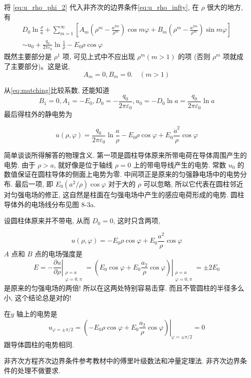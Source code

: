 将 \eqref{eq:u_rho_phi_2} 代入非齐次的边界条件\eqref{eq:u_rho_infty}, 在 $\rho$ 很大的地方, 有
\begin{equation}
    \begin{gathered}
        D_{0} \ln \frac{\rho}{a}+\sum_{m=1}^{\infty}\left[A_{m}\left(\rho^{m}-\frac{a^{2 m}}{\rho^{m}}\right) \cos m \varphi+B_{m}\left(\rho^{m}-\frac{a^{2 m}}{\rho^{m}}\right) \sin m \varphi\right] \\
        \sim u_{0}+\frac{q_{0}}{2 \pi \varepsilon_{0}} \ln \frac{1}{\rho}-E_{0} \rho \cos \varphi
    \end{gathered}
    \label{eq:matching}
\end{equation}
既然主要部分是 $\rho^{1}$ 项, 可见上式中不应出现 $\rho^{m}(m>1)$ 的项 (否则 $\rho^{m}$ 项就成了主要部分)。这是说,
$$
A_{m}=0, B_{m}=0 . \quad(m>1)
$$

从\eqref{eq:matching}比较系数, 还能知道
$$
B_{1}=0, A_{1}=-E_{0}, D_{0}=-\frac{q_{0}}{2 \pi \varepsilon_{0}}, 
u_{0}=-D_{0} \ln a=\frac{q_{0}}{2 \pi \varepsilon_{0}} \ln a
$$
最后得柱外的静电势为

$$
u(\rho, \varphi)=\frac{q_{0}}{2 \pi \varepsilon_{0}} \ln \frac{a}{\rho}-E_{0} \rho \cos \varphi+E_{0} \frac{\dot{a}^{2}}{\rho} \cos \varphi
$$

简单谈谈所得解答的物理含义. 
第一项是圆柱导体原来所带电荷在导体周围产生的电势. 
由于 $\rho>a$, 就好像是位于轴线 $\rho=0$ 上的带电导线产生的电势. 
常数 $u_{0}$ 的数值保证在圆柱导体的侧面上电势为零. 中间项正是原来的匀强静电场中的电势分布. 
最后一项, 即 $E_{0}\left(a^{2} / \rho\right) \cos \varphi$ 对于大的 $\rho$ 可以忽略,
所以它代表在圆柱邻近对匀强电场的修正, 这自然是柱面在匀强电场中产生的感应电荷形成的电势. 圆柱导体外的电场线分布见图 8-3a.

设圆柱体原来并不带电, 从而 $D_{0}=0$, 这时只含两项,

$$
u(\rho, \varphi)=-E_{0} \rho \cos \varphi+E_{0} \frac{a^{2}}{\rho} \cos \varphi
$$
$A$ 点和 $B$ 点的电场强度是
$$
E=-\left.\frac{\partial u}{\partial \rho}\right|_{\substack{\rho=a \\ \varphi=0, \pi}}
=\left.\left(E_{0} \cos \varphi+E_{0} \frac{a_{2}}{\rho} \cos \varphi\right)\right|_{\substack{\rho=a \\ \varphi=0, \pi}}
= \pm 2 E_{0}
$$
是原来的匀强电场的两倍! 所以在这两处特别容易击穿. 而且不管圆柱的半径多么小, 这个结论总是对的!

在$y$ 轴上的电势是
$$
u_{\varphi= \pm \pi / 2}=\left.\left(-E_{0} \rho \cos \varphi+E_{0} \frac{a_{2}}{\rho} \cos \varphi\right)\right|_{\varphi= \pm \pi / 2}=0
$$
跟导体圆柱的电势相同. 

非齐次方程齐次边界条件参考教材中的傅里叶级数法和冲量定理法. 非齐次边界条件的处理不做要求.

